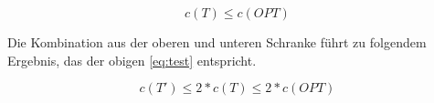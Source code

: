 \documentclass{article}
\begin{document}
\begin{equation}
c(T) \leq c(OPT)
\end{equation}

Die Kombination aus der oberen und unteren Schranke führt zu folgendem Ergebnis, das der obigen \autoref{eq:test} entspricht.

\begin{equation}
c(T') \leq 2 * c(T) \leq 2 * c(OPT)
\end{equation}



%
%
%
\nocite{busing2010graphen}
\nocite{jungnickel1994graphen}
\printbibliography[heading=bibnumbered,title={Literatur}]
\end{document}
